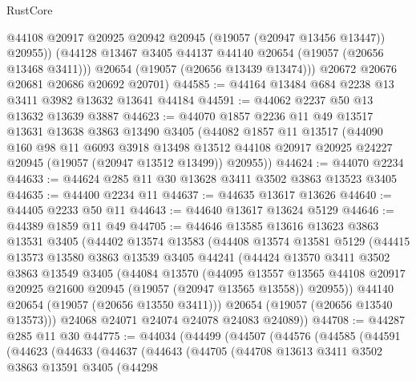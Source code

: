 \begin{lexlean}{RustCore}
\begin{coremodule}
            @44108
            @20917
            @20925
            @20942
            @20945
            (@19057 (@20947 @13456 @13447))
            @20955))
        (@44128 @13467 @3405 @44137 @44140 @20654 (@19057 (@20656 @13468 @3411)))
        @20654
        (@19057 (@20656 @13439 @13474)))
      @20672
      @20676
      @20681
      @20686
      @20692
      @20701)
@44585 := @44164 @13484 @684 @2238 @13 @3411 @3982 @13632 @13641 @44184
@44591 := @44062 @2237 @50 @13 @13632 @13639 @3887
@44623 := @44070
    @1857
    @2236
    @11
    @49
    @13517
    @13631
    @13638
    @3863
    @13490
    @3405
    (@44082
      @1857
      @11
      @13517
      (@44090
        @160
        @98
        @11
        @6093
        @3918
        @13498
        @13512
        @44108
        @20917
        @20925
        @24227
        @20945
        (@19057 (@20947 @13512 @13499))
        @20955))
@44624 := @44070 @2234
@44633 := @44624 @285 @11 @30 @13628 @3411 @3502 @3863 @13523 @3405
@44635 := @44400 @2234 @11
@44637 := @44635 @13617 @13626
@44640 := @44405 @2233 @50 @11
@44643 := @44640 @13617 @13624 @5129
@44646 := @44389 @1859 @11 @49
@44705 := @44646
    @13585
    @13616
    @13623
    @3863
    @13531
    @3405
    (@44402
      @13574
      @13583
      (@44408
        @13574
        @13581
        @5129
        (@44415
          @13573
          @13580
          @3863
          @13539
          @3405
          @44241
          (@44424
            @13570
            @3411
            @3502
            @3863
            @13549
            @3405
            (@44084
              @13570
              (@44095
                @13557
                @13565
                @44108
                @20917
                @20925
                @21600
                @20945
                (@19057 (@20947 @13565 @13558))
                @20955))
            @44140
            @20654
            (@19057 (@20656 @13550 @3411)))
          @20654
          (@19057 (@20656 @13540 @13573)))
        @24068
        @24071
        @24074
        @24078
        @24083
        @24089))
@44708 := @44287 @285 @11 @30
@44775 := @44034
    (@44499
      (@44507
        (@44576
          (@44585
            (@44591
              (@44623
                (@44633
                  (@44637
                    (@44643
                      (@44705
                        (@44708
                          @13613
                          @3411
                          @3502
                          @3863
                          @13591
                          @3405
                          (@44298

\end{coremodule}
\end{lexlean}
